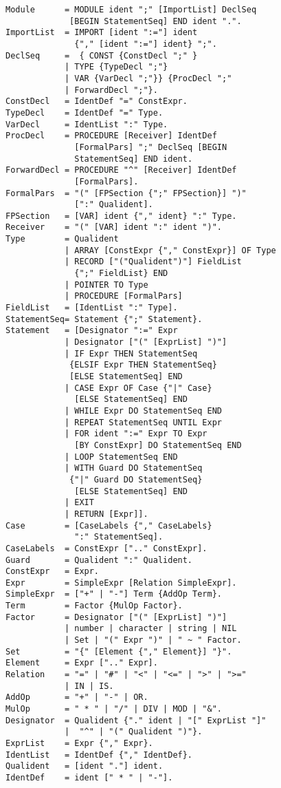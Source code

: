 {
\ifcompact \small \fi
\begin{verbatim}
Module      = MODULE ident ";" [ImportList] DeclSeq
             [BEGIN StatementSeq] END ident ".".
ImportList  = IMPORT [ident ":="] ident
              {"," [ident ":="] ident} ";".
DeclSeq     =  { CONST {ConstDecl ";" }
            | TYPE {TypeDecl ";"}
            | VAR {VarDecl ";"}} {ProcDecl ";"
            | ForwardDecl ";"}.
ConstDecl   = IdentDef "=" ConstExpr.
TypeDecl    = IdentDef "=" Type.
VarDecl     = IdentList ":" Type.
ProcDecl    = PROCEDURE [Receiver] IdentDef
              [FormalPars] ";" DeclSeq [BEGIN
              StatementSeq] END ident.
ForwardDecl = PROCEDURE "^" [Receiver] IdentDef
              [FormalPars].
FormalPars  = "(" [FPSection {";" FPSection}] ")"
              [":" Qualident].
FPSection   = [VAR] ident {"," ident} ":" Type.
Receiver    = "(" [VAR] ident ":" ident ")".
Type        = Qualident
            | ARRAY [ConstExpr {"," ConstExpr}] OF Type
            | RECORD ["("Qualident")"] FieldList
              {";" FieldList} END
            | POINTER TO Type
            | PROCEDURE [FormalPars]
FieldList   = [IdentList ":" Type].
StatementSeq= Statement {";" Statement}.
Statement   = [Designator ":=" Expr
            | Designator ["(" [ExprList] ")"]
            | IF Expr THEN StatementSeq
             {ELSIF Expr THEN StatementSeq}
             [ELSE StatementSeq] END
            | CASE Expr OF Case {"|" Case}
              [ELSE StatementSeq] END
            | WHILE Expr DO StatementSeq END
            | REPEAT StatementSeq UNTIL Expr
            | FOR ident ":=" Expr TO Expr
              [BY ConstExpr] DO StatementSeq END
            | LOOP StatementSeq END
            | WITH Guard DO StatementSeq
             {"|" Guard DO StatementSeq}
              [ELSE StatementSeq] END
            | EXIT
            | RETURN [Expr]].
Case        = [CaseLabels {"," CaseLabels}
              ":" StatementSeq].
CaseLabels  = ConstExpr [".." ConstExpr].
Guard       = Qualident ":" Qualident.
ConstExpr   = Expr.
Expr        = SimpleExpr [Relation SimpleExpr].
SimpleExpr  = ["+" | "-"] Term {AddOp Term}.
Term        = Factor {MulOp Factor}.
Factor      = Designator ["(" [ExprList] ")"]
            | number | character | string | NIL
            | Set | "(" Expr ")" | " ~ " Factor.
Set         = "{" [Element {"," Element}] "}".
Element     = Expr [".." Expr].
Relation    = "=" | "#" | "<" | "<=" | ">" | ">="
            | IN | IS.
AddOp       = "+" | "-" | OR.
MulOp       = " * " | "/" | DIV | MOD | "&".
Designator  = Qualident {"." ident | "[" ExprList "]"
            |  "^" | "(" Qualident ")"}.
ExprList    = Expr {"," Expr}.
IdentList   = IdentDef {"," IdentDef}.
Qualident   = [ident "."] ident.
IdentDef    = ident [" * " | "-"].
\end{verbatim}
}

